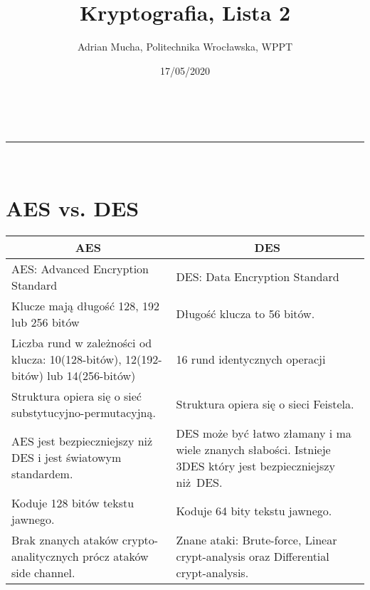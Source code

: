 \documentclass[a4paper,11pt]{article}
\makeatletter
\newcommand{\linia}{\rule{\linewidth}{0.5pt}}
\theoremstyle{mytheor}
\renewcommand{\maketitle}{
\begin{center}
\vspace{2ex}
{\huge \textsc{\@title}}
\vspace{1ex}
\\
\linia\\
\@author \hfill \@date
\vspace{4ex}
\end{center}
}
\makeatother
\begin{document}
\title{Kryptografia, Lista 2}

\author{Adrian Mucha, Politechnika Wrocławska, WPPT}

\date{17/05/2020}

\maketitle

\section*{AES vs. DES}
\begin{table}[H]
    \begin{tabular}{|p{}|p{}|}
        \hline
        \multicolumn{1}{|c|}{\textbf{AES}}                                                 & \multicolumn{1}{c|}{\textbf{DES}}                                                                         \\ \hline
        AES: Advanced Encryption Standard                                                  & DES: Data Encryption Standard                                                                             \\ \hline
        Klucze mają długość 128, 192 lub 256 bitów                                         & Długość klucza to 56 bitów.                                                                               \\ \hline
        Liczba rund w zależności od klucza: 10(128-bitów), 12(192-bitów) lub 14(256-bitów) & 16 rund identycznych operacji                                                                             \\ \hline
        Struktura opiera się o sieć substytucyjno-permutacyjną.                            & Struktura opiera się o sieci Feistela.                                                                    \\ \hline
        AES jest bezpieczniejszy niż DES i jest światowym standardem.                      & DES może być łatwo złamany i ma wiele znanych słabości. Istnieje 3DES który jest bezpieczniejszy niż DES. \\ \hline
        Koduje 128 bitów tekstu jawnego.                                                   & Koduje 64 bity tekstu jawnego.                                                                            \\ \hline
        Brak znanych ataków crypto-analitycznych prócz ataków side channel.                & Znane ataki: Brute-force, Linear crypt-analysis oraz Differential crypt-analysis.                         \\ \hline
    \end{tabular}
    \label{tab:my-table}
\end{table}
\end{document}
